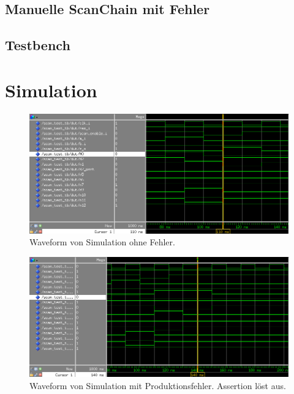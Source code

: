 \documentclass[12pt,a4paper]{article}
\begin{document}
\subsection{Manuelle ScanChain mit Fehler}


\subsection{Testbench}


\section{Simulation}

\begin{figure}[ht]
\centering
\includegraphics[width=\textwidth]{wave}
\caption{Waveform von Simulation ohne Fehler.}
\end{figure}

\begin{figure}[ht]
\centering
\includegraphics[width=\textwidth]{wave_fail}
\caption{Waveform von Simulation mit Produktionsfehler. Assertion löst aus.}
\end{figure}
\end{document}
